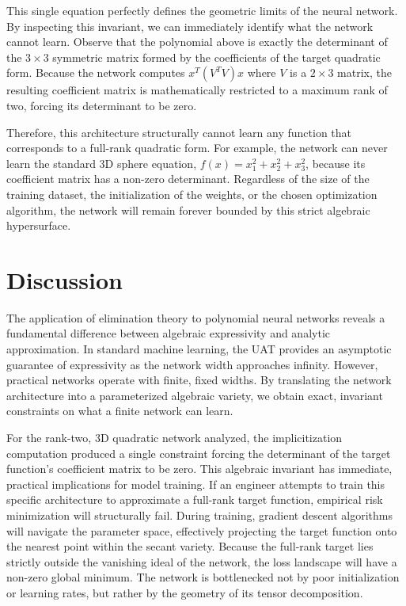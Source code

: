 \documentclass[12pt]{amsproc}
\renewcommand{\-}{\setminus}
\newcommand\<{\langle}
\renewcommand\>{\rangle}
\theoremstyle{plain}
\theoremstyle{definition}
\theoremstyle{remark}
\begin{document}
This single equation perfectly defines the geometric limits of the neural network. By inspecting this invariant, we can immediately identify what the network cannot learn. Observe that the polynomial above is exactly the determinant of the $3 \times 3$ symmetric matrix formed by the coefficients of the target quadratic form. Because the network computes $x^T (V^T V) x$ where $V$ is a $2 \times 3$ matrix, the resulting coefficient matrix is mathematically restricted to a maximum rank of two, forcing its determinant to be zero. 

Therefore, this architecture structurally cannot learn any function that corresponds to a full-rank quadratic form. For example, the network can never learn the standard 3D sphere equation, $f(x) = x_1^2 + x_2^2 + x_3^2$, because its coefficient matrix has a non-zero determinant. Regardless of the size of the training dataset, the initialization of the weights, or the chosen optimization algorithm, the network will remain forever bounded by this strict algebraic hypersurface.

\section{Discussion}

The application of elimination theory to polynomial neural networks reveals a fundamental difference between algebraic expressivity and analytic approximation. In standard machine learning, the UAT provides an asymptotic guarantee of expressivity as the network width approaches infinity. However, practical networks operate with finite, fixed widths. By translating the network architecture into a parameterized algebraic variety, we obtain exact, invariant constraints on what a finite network can learn.

For the rank-two, 3D quadratic network analyzed, the implicitization computation produced a single constraint forcing the determinant of the target function's coefficient matrix to be zero. This algebraic invariant has immediate, practical implications for model training. If an engineer attempts to train this specific architecture to approximate a full-rank target function, empirical risk minimization will structurally fail. During training, gradient descent algorithms will navigate the parameter space, effectively projecting the target function onto the nearest point within the secant variety. Because the full-rank target lies strictly outside the vanishing ideal of the network, the loss landscape will have a non-zero global minimum. The network is bottlenecked not by poor initialization or learning rates, but rather by the geometry of its tensor decomposition. 
\end{document}
